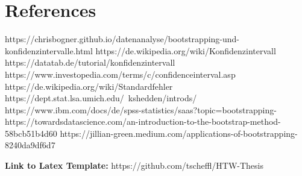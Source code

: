 
\chapter{References} \label{References}

https://chrisbogner.github.io/datenanalyse/bootstrapping-und-konfidenzintervalle.html
https://de.wikipedia.org/wiki/Konfidenzintervall
https://datatab.de/tutorial/konfidenzintervall
https://www.investopedia.com/terms/c/confidenceinterval.asp
https://de.wikipedia.org/wiki/Standardfehler
https://dept.stat.lsa.umich.edu/~kshedden/introds/
https://www.ibm.com/docs/de/spss-statistics/saas?topic=bootstrapping-
https://towardsdatascience.com/an-introduction-to-the-bootstrap-method-58bcb51b4d60
https://jillian-green.medium.com/applications-of-bootstrapping-8240da9df6d7

\textbf{Link to Latex Template:}
https://github.com/tscheffl/HTW-Thesis


